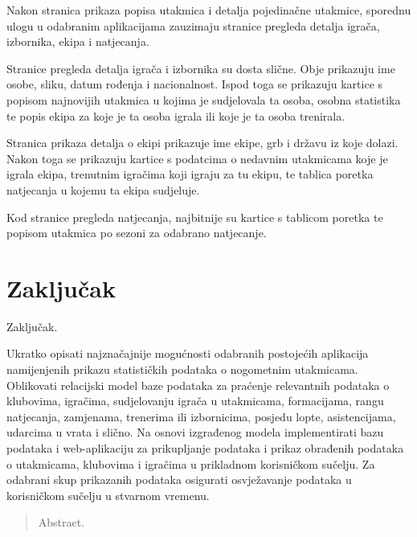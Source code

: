 \documentclass[times, utf8, zavrsni]{fer}
\begin{document}
Nakon stranica prikaza popisa utakmica i detalja pojedinačne utakmice, sporednu ulogu u odabranim aplikacijama zauzimaju stranice pregleda detalja igrača, izbornika, ekipa i natjecanja.

Stranice pregleda detalja igrača i izbornika su dosta slične. Obje prikazuju ime osobe, sliku, datum rođenja i nacionalnost.
Ispod toga se prikazuju kartice s popisom najnovijih utakmica u kojima je sudjelovala ta osoba, osobna statistika te popis ekipa za koje je ta osoba igrala ili koje je ta osoba trenirala.

Stranica prikaza detalja o ekipi prikazuje ime ekipe, grb i državu iz koje dolazi. Nakon toga se prikazuju kartice s podatcima o nedavnim utakmicama koje je igrala ekipa,
trenutnim igračima koji igraju za tu ekipu, te tablica poretka natjecanja u kojemu ta ekipa sudjeluje.

Kod stranice pregleda natjecanja, najbitnije su kartice s tablicom poretka te popisom utakmica po sezoni za odabrano natjecanje.

\chapter{Zaključak}
Zaključak.




\begin{sazetak}
Ukratko opisati najznačajnije mogućnosti odabranih postojećih aplikacija namijenjenih prikazu statističkih
podataka o nogometnim utakmicama. Oblikovati relacijski model baze podataka za praćenje relevantnih
podataka o klubovima, igračima, sudjelovanju igrača u utakmicama, formacijama, rangu natjecanja,
zamjenama, trenerima ili izbornicima, posjedu lopte, asistencijama, udarcima u vrata i slično. Na osnovi
izgrađenog modela implementirati bazu podataka i web-aplikaciju za prikupljanje podataka i prikaz obrađenih
podataka o utakmicama, klubovima i igračima u prikladnom korisničkom sučelju. Za odabrani skup prikazanih
podataka osigurati osvježavanje podataka u korisničkom sučelju u stvarnom vremenu.

\end{sazetak}

\begin{abstract}
Abstract.

\end{abstract}
\end{document}
